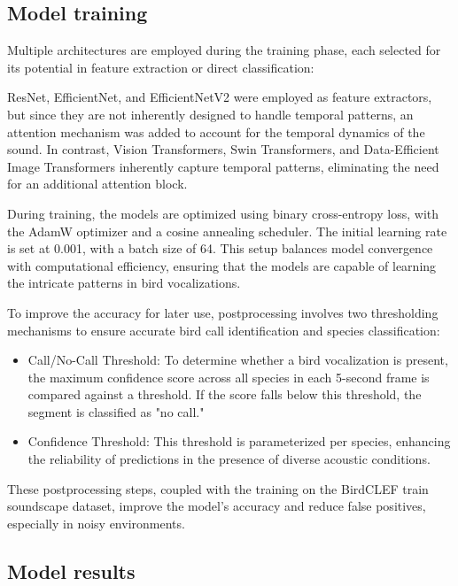 \subsection{Model training}
Multiple architectures are employed during the training phase, each selected for its potential in feature extraction or direct classification:

ResNet, EfficientNet, and EfficientNetV2\cite{he2016deep,tan2019efficientnet,tan2021efficientnetv2} were employed as feature extractors, but since they are not inherently designed to handle temporal patterns, an attention mechanism was added to account for the temporal dynamics of the sound. In contrast, Vision Transformers, Swin Transformers, and Data-Efficient Image Transformers \cite{dosovitskiy2020image, liu2021swin, touvron2021training}inherently capture temporal patterns, eliminating the need for an additional attention block.

During training, the models are optimized using binary cross-entropy loss, with the AdamW optimizer and a cosine annealing scheduler. The initial learning rate is set at 0.001, with a batch size of 64. This setup balances model convergence with computational efficiency, ensuring that the models are capable of learning the intricate patterns in bird vocalizations.

To improve the accuracy for later use, postprocessing involves two thresholding mechanisms to ensure accurate bird call identification and species classification:

\begin{itemize}
\item Call/No-Call Threshold: To determine whether a bird vocalization is present, the maximum confidence score across all species in each 5-second frame is compared against a threshold. If the score falls below this threshold, the segment is classified as "no call."
\item Confidence Threshold: This threshold is parameterized per species, enhancing the reliability of predictions in the presence of diverse acoustic conditions.
\end{itemize}

These postprocessing steps, coupled with the training on the BirdCLEF train soundscape dataset, improve the model's accuracy and reduce false positives, especially in noisy environments.

\subsection{Model results}

